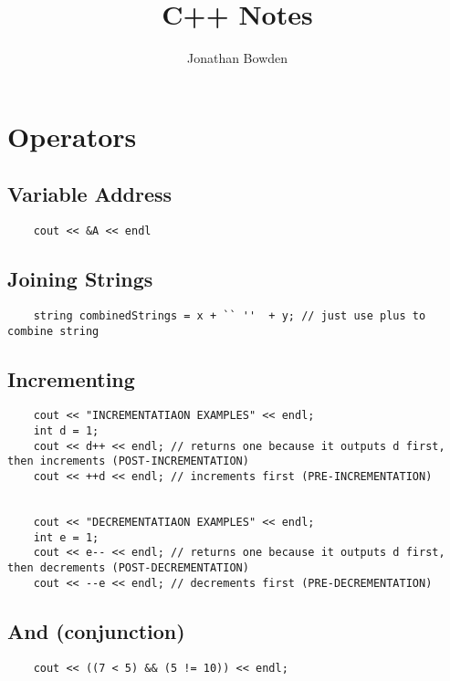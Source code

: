 \documentclass{article}
\title{C++ Notes}
\author{Jonathan Bowden}
\begin{document}


\maketitle

\section{Operators}

\subsection{Variable Address}
\begin{lstlisting}
	cout << &A << endl
\end{lstlisting}

\subsection{Joining Strings}
\begin{lstlisting}
	string combinedStrings = x + `` ''  + y; // just use plus to combine string
\end{lstlisting}

\subsection{Incrementing}
\begin{lstlisting}
	cout << "INCREMENTATIAON EXAMPLES" << endl;
	int d = 1;
	cout << d++ << endl; // returns one because it outputs d first, then increments (POST-INCREMENTATION)
	cout << ++d << endl; // increments first (PRE-INCREMENTATION)


	cout << "DECREMENTATIAON EXAMPLES" << endl;
	int e = 1;
	cout << e-- << endl; // returns one because it outputs d first, then decrements (POST-DECREMENTATION)
	cout << --e << endl; // decrements first (PRE-DECREMENTATION)
\end{lstlisting}

\subsection{And (conjunction)}
\begin{lstlisting}
	cout << ((7 < 5) && (5 != 10)) << endl;
\end{lstlisting}
\end{document}
